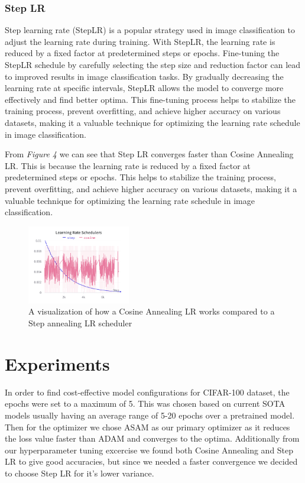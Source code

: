 \documentclass{article}
\begin{document}
\subsubsection{Step LR}
Step learning rate (StepLR) is a popular strategy used in image classification to adjust the learning rate during training. 
With StepLR, the learning rate is reduced by a fixed factor at predetermined steps or epochs. 
Fine-tuning the StepLR schedule by carefully selecting the step size and reduction factor can lead to improved results in image classification tasks. 
By gradually decreasing the learning rate at specific intervals, StepLR allows the model to converge more effectively and find better optima. 
This fine-tuning process helps to stabilize the training process, prevent overfitting, and achieve higher accuracy on various datasets, making it a valuable technique for optimizing the learning rate schedule in image classification.

From \textit{Figure 4} we can see that Step LR converges faster than Cosine Annealing LR. 
This is because the learning rate is reduced by a fixed factor at predetermined steps or epochs. 
This helps to stabilize the training process, prevent overfitting, and achieve higher accuracy on various datasets, making it a valuable technique for optimizing the learning rate schedule in image classification.

\begin{figure}[ht]
    \vskip 0.2in
    \centering
    \includegraphics[width=0.4\textwidth]{learning_rate_schedulers.png}
    \caption{A visualization of how a Cosine Annealing LR works compared to a Step annealing LR scheduler}
    \label{fig:foobar}
    \vskip -0.2in
\end{figure}


\section{Experiments}
In order to find cost-effective model configurations for CIFAR-100 dataset, the epochs were set to a maximum of 5. 
This was chosen based on current SOTA models usually having an average range of 5-20 epochs over a pretrained model. 
Then for the optimizer we chose ASAM as our primary optimizer as it reduces the loss value faster than ADAM and converges to the optima. 
Additionally from our hyperparameter tuning excercise we found both Cosine Annealing and Step LR to give good accuracies, but since we needed a faster convergence we decided to choose Step LR for it's lower variance.
\end{document}
